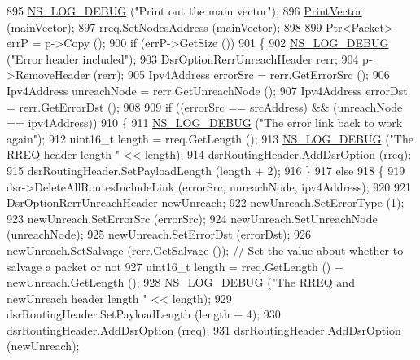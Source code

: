 \begin{DoxyCode}
895           \hyperlink{group__logging_ga413f1886406d49f59a6a0a89b77b4d0a}{NS\_LOG\_DEBUG} (\textcolor{stringliteral}{"Print out the main vector"});
896           \hyperlink{classns3_1_1dsr_1_1DsrOptions_a44ae8e58769880ec9c0150bb28652350}{PrintVector} (mainVector);
897           rreq.SetNodesAddress (mainVector);
898 
899           Ptr<Packet> errP = p->Copy ();
900           \textcolor{keywordflow}{if} (errP->GetSize ())
901             \{
902               \hyperlink{group__logging_ga413f1886406d49f59a6a0a89b77b4d0a}{NS\_LOG\_DEBUG} (\textcolor{stringliteral}{"Error header included"});
903               DsrOptionRerrUnreachHeader rerr;
904               p->RemoveHeader (rerr);
905               Ipv4Address errorSrc = rerr.GetErrorSrc ();
906               Ipv4Address unreachNode = rerr.GetUnreachNode ();
907               Ipv4Address errorDst = rerr.GetErrorDst ();
908 
909               \textcolor{keywordflow}{if} ((errorSrc == srcAddress) && (unreachNode == ipv4Address))
910                 \{
911                   \hyperlink{group__logging_ga413f1886406d49f59a6a0a89b77b4d0a}{NS\_LOG\_DEBUG} (\textcolor{stringliteral}{"The error link back to work again"});
912                   uint16\_t length = rreq.GetLength ();
913                   \hyperlink{group__logging_ga413f1886406d49f59a6a0a89b77b4d0a}{NS\_LOG\_DEBUG} (\textcolor{stringliteral}{"The RREQ header length "} <<  length);
914                   dsrRoutingHeader.AddDsrOption (rreq);
915                   dsrRoutingHeader.SetPayloadLength (length + 2);
916                 \}
917               \textcolor{keywordflow}{else}
918                 \{
919                   dsr->DeleteAllRoutesIncludeLink (errorSrc, unreachNode, ipv4Address);
920 
921                   DsrOptionRerrUnreachHeader newUnreach;
922                   newUnreach.SetErrorType (1);
923                   newUnreach.SetErrorSrc (errorSrc);
924                   newUnreach.SetUnreachNode (unreachNode);
925                   newUnreach.SetErrorDst (errorDst);
926                   newUnreach.SetSalvage (rerr.GetSalvage ()); \textcolor{comment}{// Set the value about whether to salvage a
       packet or not}
927                   uint16\_t length = rreq.GetLength () + newUnreach.GetLength ();
928                   \hyperlink{group__logging_ga413f1886406d49f59a6a0a89b77b4d0a}{NS\_LOG\_DEBUG} (\textcolor{stringliteral}{"The RREQ and newUnreach header length "} <<  length);
929                   dsrRoutingHeader.SetPayloadLength (length + 4);
930                   dsrRoutingHeader.AddDsrOption (rreq);
931                   dsrRoutingHeader.AddDsrOption (newUnreach);

\end{DoxyCode}
